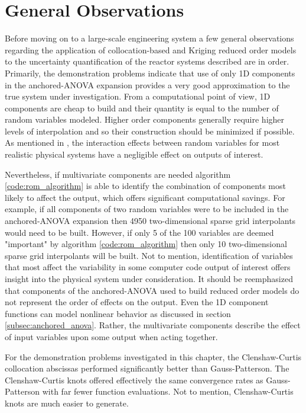 \section{General Observations}
\label{sec:general_observations}

Before moving on to a large-scale engineering system a few general observations regarding the application of collocation-based and Kriging reduced order models to the uncertainty quantification of the  reactor systems described are in order. Primarily, the demonstration problems indicate that use of only 1D components in the anchored-\ac{ANOVA} expansion provides a very good approximation to the true system under investigation. From a computational point of view, 1D components are cheap to build and their quantity is equal to the number of random variables modeled. Higher order components generally require higher levels of interpolation and so their construction should be minimized if possible. As mentioned in \cite{AHSGC_HighDimensions}, the interaction effects between random variables for most realistic physical systems have a negligible effect on outputs of interest. 

Nevertheless, if multivariate components are needed algorithm \ref{code:rom_algorithm} is able to identify the combination of components most likely to affect the output, which offers significant computational savings. For example, if all components of two random variables were to be included in the anchored-\ac{ANOVA} expansion then 4950 two-dimensional sparse grid interpolants would need to be built. However, if only 5 of the 100 variables are deemed "important" by algorithm \ref{code:rom_algorithm} then only 10 two-dimensional sparse grid interpolants will be built. Not to mention, identification of variables that most affect the variability in some computer code output of interest offers insight into the physical system under consideration. It should be reemphasized that components of the anchored-\ac{ANOVA} used to build reduced order models do not represent the order of effects on the output. Even the 1D component functions can model nonlinear behavior as discussed in section \ref{subsec:anchored_anova}. Rather, the multivariate components describe the effect of input variables upon some output when acting together.    

For the demonstration problems investigated in this chapter, the Clenshaw-Curtis collocation abscissas performed significantly better than Gauss-Patterson. The Clenshaw-Curtis knots offered effectively the same convergence rates as Gauss-Patterson with far fewer function evaluations. Not to mention, Clenshaw-Curtis knots are much easier to generate.

